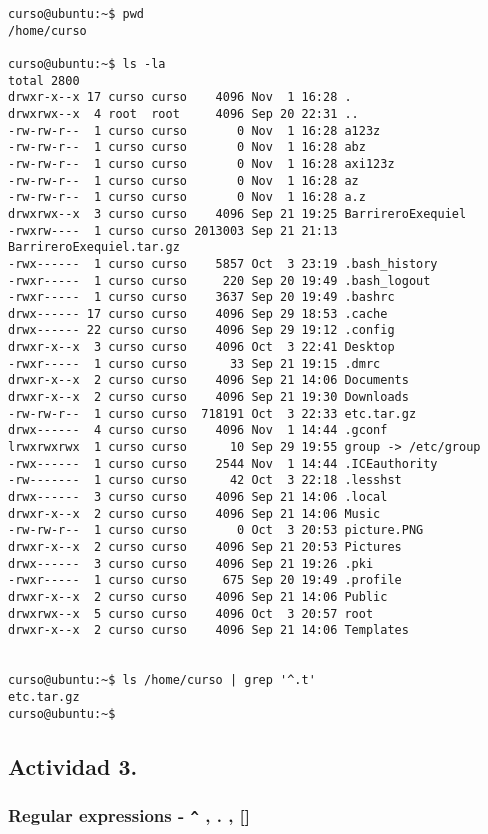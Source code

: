 \documentclass[a4paper,11pt,spanish]{article} %
\newenvironment{myscriptlisting}
{\begin{list}{}{\setlength{\leftmargin}{1em}}\item\scriptsize\bfseries}
{\end{list}}
\begin{document}
\begin{myscriptlisting}
 \begin{verbatim}
curso@ubuntu:~$ pwd
/home/curso

curso@ubuntu:~$ ls -la
total 2800
drwxr-x--x 17 curso curso    4096 Nov  1 16:28 .
drwxrwx--x  4 root  root     4096 Sep 20 22:31 ..
-rw-rw-r--  1 curso curso       0 Nov  1 16:28 a123z
-rw-rw-r--  1 curso curso       0 Nov  1 16:28 abz
-rw-rw-r--  1 curso curso       0 Nov  1 16:28 axi123z
-rw-rw-r--  1 curso curso       0 Nov  1 16:28 az
-rw-rw-r--  1 curso curso       0 Nov  1 16:28 a.z
drwxrwx--x  3 curso curso    4096 Sep 21 19:25 BarrireroExequiel
-rwxrw----  1 curso curso 2013003 Sep 21 21:13 BarrireroExequiel.tar.gz
-rwx------  1 curso curso    5857 Oct  3 23:19 .bash_history
-rwxr-----  1 curso curso     220 Sep 20 19:49 .bash_logout
-rwxr-----  1 curso curso    3637 Sep 20 19:49 .bashrc
drwx------ 17 curso curso    4096 Sep 29 18:53 .cache
drwx------ 22 curso curso    4096 Sep 29 19:12 .config
drwxr-x--x  3 curso curso    4096 Oct  3 22:41 Desktop
-rwxr-----  1 curso curso      33 Sep 21 19:15 .dmrc
drwxr-x--x  2 curso curso    4096 Sep 21 14:06 Documents
drwxr-x--x  2 curso curso    4096 Sep 21 19:30 Downloads
-rw-rw-r--  1 curso curso  718191 Oct  3 22:33 etc.tar.gz
drwx------  4 curso curso    4096 Nov  1 14:44 .gconf
lrwxrwxrwx  1 curso curso      10 Sep 29 19:55 group -> /etc/group
-rwx------  1 curso curso    2544 Nov  1 14:44 .ICEauthority
-rw-------  1 curso curso      42 Oct  3 22:18 .lesshst
drwx------  3 curso curso    4096 Sep 21 14:06 .local
drwxr-x--x  2 curso curso    4096 Sep 21 14:06 Music
-rw-rw-r--  1 curso curso       0 Oct  3 20:53 picture.PNG
drwxr-x--x  2 curso curso    4096 Sep 21 20:53 Pictures
drwx------  3 curso curso    4096 Sep 21 19:26 .pki
-rwxr-----  1 curso curso     675 Sep 20 19:49 .profile
drwxr-x--x  2 curso curso    4096 Sep 21 14:06 Public
drwxrwx--x  5 curso curso    4096 Oct  3 20:57 root
drwxr-x--x  2 curso curso    4096 Sep 21 14:06 Templates


curso@ubuntu:~$ ls /home/curso | grep '^.t'
etc.tar.gz
curso@ubuntu:~$ 

 \end{verbatim}
\end{myscriptlisting}

\subsection{Actividad 3.}

\subsubsection{Regular expressions - \texttt{\^} , . , []}
\end{document}
